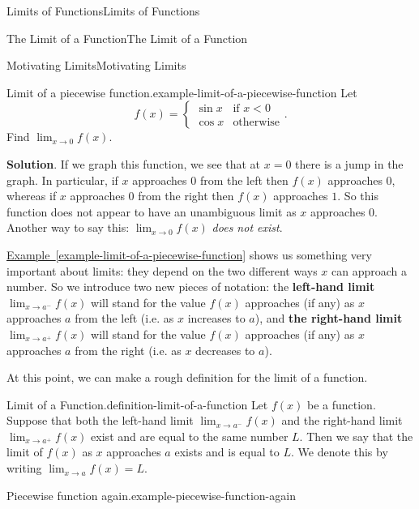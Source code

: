 \documentclass[10pt,]{book}
\newcommand{\terminology}[1]{\textbf{#1}}
\numberwithin{equation}{section}
\begin{document}
\begin{chapterptx}{Limits of Functions}{}{Limits of Functions}{}{}
\begin{sectionptx}{The Limit of a Function}{}{The Limit of a Function}{}{}
\begin{subsectionptx}{Motivating Limits}{}{Motivating Limits}{}{}
\begin{example}{Limit of a piecewise function.}{example-limit-of-a-piecewise-function}%
\hypertarget{p-10}{}%
Let%
%
\begin{equation*}
f(x) = \begin{cases} \sin x & \text{if $x<0$} \\ \cos x & \text{otherwise} \end{cases}.
\end{equation*}
\hypertarget{p-11}{}%
Find \(\lim_{x\to0}f(x)\).%
\par\smallskip%
\noindent\textbf{Solution}.\hypertarget{solution-2}{}\quad%
\hypertarget{p-12}{}%
If we graph this function, we see that at \(x=0\) there is a jump in the graph. In particular, if \(x\) approaches \(0\) from the left then \(f(x)\) approaches \(0\), whereas if \(x\) approaches \(0\) from the right then \(f(x)\) approaches \(1\). So this function does not appear to have an unambiguous limit as \(x\) approaches \(0\). Another way to say this: \(\lim_{x\to0}f(x)\) \emph{does not exist}.%
\end{example}
\hypertarget{p-13}{}%
\hyperref[example-limit-of-a-piecewise-function]{Example~\ref{example-limit-of-a-piecewise-function}} shows us something very important about limits: they depend on the two different ways \(x\) can approach a number. So we introduce two new pieces of notation: the \terminology{left-hand limit} \(\lim_{x\to a^{-}}f(x)\) will stand for the value \(f(x)\) approaches (if any) as \(x\) approaches \(a\) from the left (i.e. as \(x\) increases to \(a\)), and \terminology{the right-hand limit} \(\lim_{x\to a^{+}}f(x)\) will stand for the value \(f(x)\) approaches (if any) as \(x\) approaches \(a\) from the right (i.e. as \(x\) decreases to \(a\)).%
\par
\hypertarget{p-14}{}%
At this point, we can make a rough definition for the limit of a function.%
\begin{definition}{Limit of a Function.}{definition-limit-of-a-function}%
\hypertarget{p-15}{}%
Let \(f(x)\) be a function. Suppose that both the left-hand limit \(\lim_{x\to a^{-}}f(x)\) and the right-hand limit \(\lim_{x\to a^{+}}f(x)\) exist and are equal to the same number \(L\). Then we say that the limit of \(f(x)\) as \(x\) approaches \(a\) exists and is equal to \(L\). We denote this by writing \(\lim_{x\to a}f(x) = L\).%
\end{definition}
\begin{example}{Piecewise function again.}{example-piecewise-function-again}%

\end{example}
\end{subsectionptx}
\end{sectionptx}
\end{chapterptx}
\end{document}
